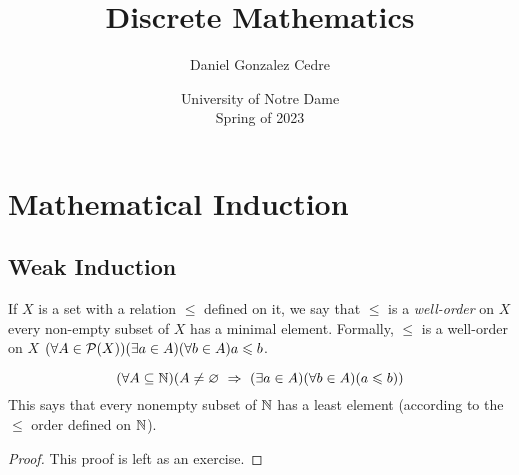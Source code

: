 







\title{Discrete Mathematics}
\author{Daniel Gonzalez Cedre}
\date{University of Notre Dame \\ Spring of 2023}
\maketitle

\setcounter{chapter}{3}
\chapter{Mathematical Induction}

\section{Weak Induction}

\begin{definition}
    If $X$ is a set with a relation $\leq$ defined on it,
    we say that $\leq$ is a \emph{well-order} on $X$ \iffbydefn
    every non-empty subset of $X$ has a minimal element.
    Formally, $\leq$ is a well-order on $X$
    \iffbydefn $\pn*{\forall A \in \power{X}}\pn*{\exists a \in A}\pn*{\forall b \in A}{a \leq b}$.
\end{definition}

\begin{theorem}\label{thm:lep}
    \vspace{-\parskip}
    \[
        \pn*{\forall A \subseteq \N}\pn*{A \neq \emptyset \implies \pn*{\exists a \in A}\pn*{\forall b \in A}\pn*{a \leq b}}
    \]
    This says that every nonempty subset of \(\mathbb{N}\) has a least element
    (according to the \(\leq\) order defined on \(\mathbb{N}\)).
\end{theorem}
\begin{proof}
    This proof is left as an exercise.
\end{proof}

